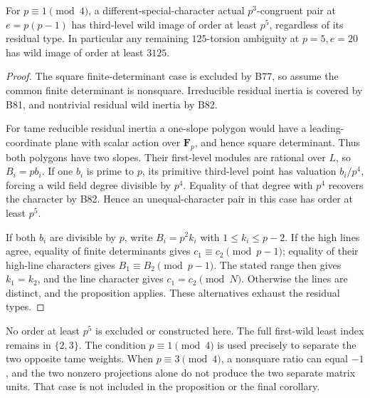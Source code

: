 \begin{corollary}[One lower bound across all residual types at \(p=5\)]
\label{cor:B-RD83}
For \(p\equiv1\pmod4\), a different-special-character
actual \(p^3\)-congruent pair at \(e=p(p-1)\) has
third-level wild image of order at least \(p^5\), regardless
of its residual type. In particular any remaining
\(125\)-torsion ambiguity at \(p=5,e=20\) has wild image
of order at least \(3125\).
\end{corollary}
\begin{proof}
The square finite-determinant case is excluded by B77, so
assume the common finite determinant is nonsquare.
Irreducible residual inertia is covered by B81, and
nontrivial residual wild inertia by B82.

For tame reducible residual inertia a one-slope polygon
would have a leading-coordinate plane with scalar action
over \(\mathbf F_p\), and hence square determinant.
Thus both polygons have two slopes. Their first-level
modules are rational over \(L\), so \(B_i=pb_i\).
If one \(b_i\) is prime to \(p\), its primitive third-level
point has valuation \(b_i/p^4\), forcing a wild field
degree divisible by \(p^4\). Equality of that degree
with \(p^4\) recovers the character by B82. Hence an
unequal-character pair in this case has order at least
\(p^5\).

If both \(b_i\) are divisible by \(p\), write
\(B_i=p^2k_i\) with \(1\le k_i\le p-2\). If the high
lines agree, equality of finite determinants gives
\(c_1\equiv c_2\pmod{p-1}\); equality of their high-line
characters gives \(B_1\equiv B_2\pmod{p-1}\). The stated
range then gives \(k_1=k_2\), and the line character gives
\(c_1=c_2\pmod N\). Otherwise the lines are distinct,
and the proposition applies. These alternatives exhaust
the residual types.
\end{proof}

\begin{remark}
\label{rem:B-RD83-scope}
No order at least \(p^5\) is excluded or constructed here.
The full first-wild least index remains in \(\{2,3\}\).
The condition \(p\equiv1\pmod4\) is used precisely to
separate the two opposite tame weights. When
\(p\equiv3\pmod4\), a nonsquare ratio can equal \(-1\),
and the two nonzero projections alone do not produce the
two separate matrix units. That case is not included in
the proposition or the final corollary.
\end{remark}
